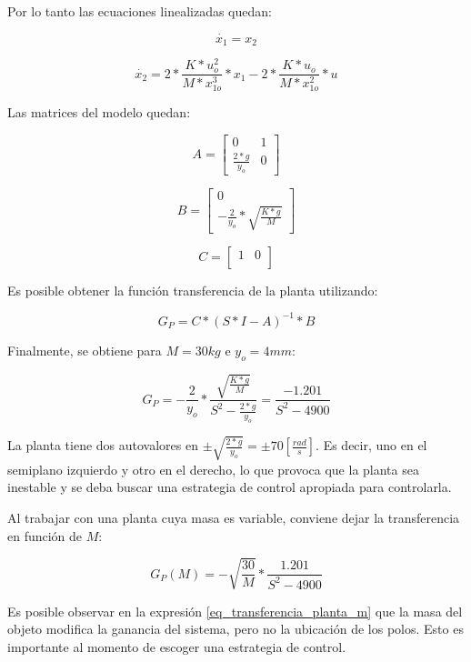 \noindent Por lo tanto las ecuaciones linealizadas quedan:

\begin{equation}
	\dot{x_{1}}=x_{2}
\end{equation}

\begin{equation}
	\dot{x_{2}}=2*\frac{K*u_{o}^{2}}{M*x_{1o}^{3}}*x_{1}-2*\frac{K*u_{o}}{M*x_{1o}^{2}}*u
\end{equation}

\noindent Las matrices del modelo quedan:

\begin{equation}
	A=\begin{bmatrix}
		0 & 1\\
		\frac{2*g}{y_{o}} & 0
	\end{bmatrix}
\end{equation}

\begin{equation}
	B=\begin{bmatrix}
		0\\
		-\frac{2}{y_{o}}*\sqrt{\frac{K*g}{M}}
	\end{bmatrix}
\end{equation}

\begin{equation}
	C=\begin{bmatrix}
		1 & 0\\
	\end{bmatrix}
\end{equation}

\noindent Es posible obtener la función transferencia de la planta utilizando:

\begin{equation}\label{eq_transferencia_planta}
	G_{P}=C*(S*I-A)^{-1}*B
\end{equation}

\noindent Finalmente, se obtiene para $M=30kg$ e $y_{o}=4mm$:

\begin{equation}
	G_{P}=-\frac{2}{y_{o}}*\frac{\sqrt{\frac{K*g}{M}}}{S^2-\frac{2*g}{y_{o}}}=\frac{-1.201}{S^{2}-4900}
\end{equation}

\noindent La planta tiene dos autovalores en $\pm\sqrt{\frac{2*g}{y_{o}}}=\pm70[\frac{rad}{s}]$. Es decir, uno en el semiplano izquierdo y otro en el derecho, lo que provoca que la planta sea inestable y se deba buscar una estrategia de control apropiada para controlarla.

\noindent Al trabajar con una planta cuya masa es variable, conviene dejar la transferencia en función de $M$:

\begin{equation} \label{eq_transferencia_planta_m}
		G_{P}(M)=-\sqrt{\frac{30}{M}}*\frac{1.201}{S^{2}-4900}
\end{equation}

\noindent Es posible observar en la expresión \ref{eq_transferencia_planta_m} que la masa del objeto modifica la ganancia del sistema, pero no la ubicación de los polos. Esto es importante al momento de escoger una estrategia de control.

